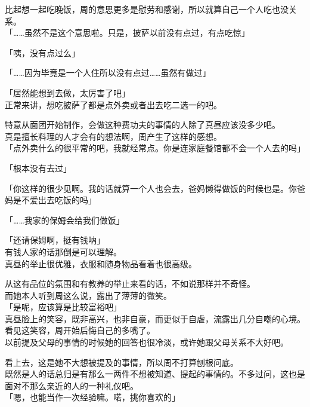 比起想一起吃晚饭，周的意思更多是慰劳和感谢，所以就算自己一个人吃也没关系。\\

「……虽然不是这个意思啦。只是，披萨以前没有点过，有点吃惊」

「咦，没有点过么」

「……因为毕竟是一个人住所以没有点过……虽然有做过」

「居然能想到去做，太厉害了吧」\\

正常来讲，想吃披萨了都是点外卖或者出去吃二选一的吧。

特意从面团开始制作，会做这种费功夫的事情的人除了真昼应该没多少吧。\\

真是擅长料理的人才会有的想法啊，周产生了这样的感想。\\

「点外卖什么的很平常的吧，我就经常点。你是连家庭餐馆都不会一个人去的吗」

「根本没有去过」

「你这样的很少见啊。我的话就算一个人也会去，爸妈懒得做饭的时候也是。你爸妈是不爱出去吃饭的吗」

「……我家的保姆会给我们做饭」

「还请保姆啊，挺有钱呐」\\

有钱人家的话那倒是可以理解。\\

真昼的举止很优雅，衣服和随身物品看着也很高级。

从这有品位的氛围和有教养的举止来看的话，不如说那样并不奇怪。\\

而她本人听到周这么说，露出了薄薄的微笑。\\

「是呢，应该算是比较富裕吧」\\

真昼脸上的笑容，既非高兴，也非自豪，而更似于自虐，流露出几分自嘲的心境。看见这笑容，周开始后悔自己的多嘴了。\\

以前提及父母的事情的时候她的回答也很冷淡，或许她跟父母关系不大好吧。

看上去，这是她不大想被提及的事情，所以周不打算刨根问底。\\

既然是人的话总归是有那么一两件不想被知道、提起的事情的。不多过问，这也是面对不那么亲近的人的一种礼仪吧。\\

「嗯，也能当作一次经验嘛。喏，挑你喜欢的」\\

